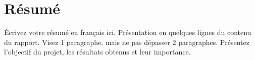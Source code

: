 \chapter*{\hfill Résumé \hfill}

Écrivez votre résumé en français ici. Présentation en quelques lignes du contenu du rapport. Visez 1 paragraphe, mais ne pas dépasser 2 paragraphes. Présentez l'objectif du projet, les résultats obtenus et leur importance.

